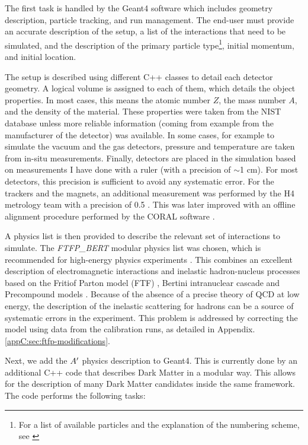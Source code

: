 The first task is handled by the Geant4 software\cite{AGOSTINELLI2003250} which includes geometry description, particle tracking, and run management. The end-user must provide an accurate description of the setup, a list of the interactions that need to be simulated, and the description of the primary particle type\footnote{For a list of available particles and the explanation of the numbering scheme, see \cite{geant4-pdg}}, initial momentum, and initial location.

The setup is described using different C++ classes to detail each detector geometry. A logical volume is assigned to each of them, which details the object properties. In most cases, this means the atomic number $Z$, the mass number $A$, and the density of the material. These properties were taken from the NIST database \cite{nist-database} unless more reliable information (coming from example from the manufacturer of the detector) was available. In some cases, for example to simulate the vacuum and the gas detectors, pressure and temperature are taken from in-situ measurements. Finally, detectors are placed in the simulation based on measurements I have done with a ruler (with a precision of $\sim$1 \si{\centi\meter}). For most detectors, this precision is sufficient to avoid any systematic error. For the trackers and the magnets, an additional measurement was performed by the H4 metrology team with a precision of 0.5 \mmi \cite{meterology-measurements}. This was later improved with an offline alignment procedure performed by the CORAL software \cite{ABBON2007455}. 

A physics list is then provided to describe the relevant set of interactions to simulate. The \textit{\textrm{FTFP\_BERT}} modular physics list was chosen, which is recommended for high-energy physics experiments \cite{ALLISON2016186}. This combines an excellent description of electromagnetic interactions and inelastic hadron-nucleus processes based on the Fritiof Parton model (FTF) \cite{Uzhinsky:2013hea}, Bertini intranuclear cascade \cite{Heikkinen:2003sc} and Precompound models \cite{Apostolakis:2009zz}. Because of the absence of a precise theory of QCD at low energy, the description of the inelastic scattering for hadrons can be a source of systematic errors in the experiment. This problem is addressed by correcting the model using data from the calibration runs, as detailed in Appendix.\ref{appC:sec:ftfp-modifications}.

Next, we add the $A'$ physics description to Geant4. This is currently done by an additional C++ code that describes Dark Matter in a modular way. This allows for the description of many Dark Matter candidates inside the same framework. The code performs the following tasks:

